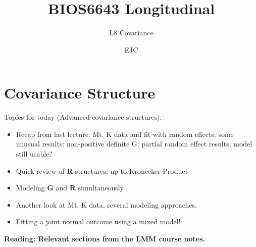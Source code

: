 \documentclass[
  9pt,
  ignorenonframetext,
]{beamer}
\title{BIOS6643 Longitudinal}
\subtitle{L8 Covariance}
\author{EJC}
\date{}
\institute{Department of Biostatistics ~~ Informatics}
\begin{document}
\frame{\titlepage}

\begin{frame}[allowframebreaks]
  \tableofcontents[hideallsubsections]
\end{frame}
\hypertarget{covariance-structure}{%
\section{Covariance Structure}\label{covariance-structure}}

\begin{frame}{Topics for today (Advanced covariance structures):}
\protect\hypertarget{topics-for-today-advanced-covariance-structures}{}
\begin{itemize}
\item
  Recap from last lecture: Mt. K data and fit with random effects; some
  unusual results: non-positive definite G; partial random effect
  results; model still usable?
\item
  Quick review of \(\pmb R\) structures, up to Kronecker Product
\item
  Modeling \(\pmb G\) and \(\pmb R\) simultaneously
\item
  Another look at Mt. K data, several modeling approaches.
\item
  Fitting a joint normal outcome using a mixed model!
\end{itemize}

\vspace{\baselineskip}

\textbf{Reading: Relevant sections from the LMM course notes.}
\end{frame}
\end{document}
